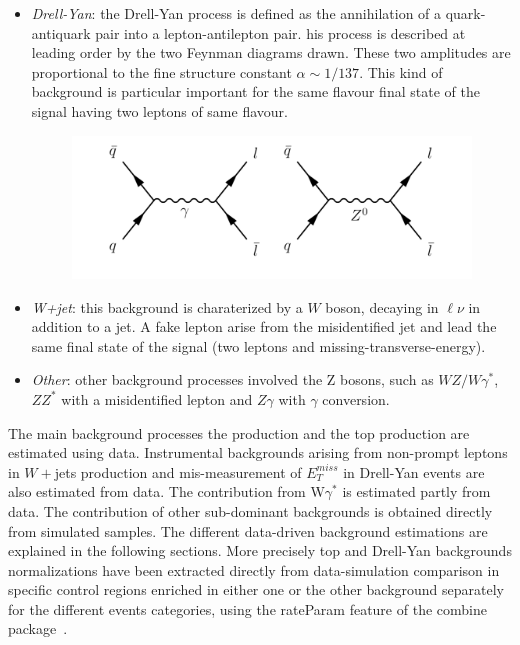 \begin{itemize}
\begin{figure}
\end{figure}
\newpage
\item \textit{Drell-Yan}: the Drell-Yan process is defined as the annihilation of a quark-antiquark pair into a lepton-antilepton pair. his process is described at leading order by
the two Feynman diagrams drawn. These two amplitudes are proportional to the fine structure constant $\alpha \sim 1/137$.
This kind of background is particular important for the same flavour final state of the signal having two leptons  of same flavour.
\begin{figure}[h]
\centering
\vspace{0.5cm}
\includegraphics[scale= 0.7]{../Cap5/dy}
\end{figure}

\item \textit{W+jet}: this background is charaterized by a $W$ boson, decaying in $\ell \nu$ in addition to a jet. A fake lepton arise from the misidentified jet and lead the same final state of the signal (two leptons and missing-transverse-energy). 

\item \textit{Other}: other background processes involved the Z bosons, such as $WZ/W\gamma^*$, $ZZ^*$ with a misidentified lepton and $Z\gamma$ with $\gamma$ conversion.

\end{itemize}
The main background processes the \WW production and the top production  are estimated using data. 
Instrumental backgrounds arising from non-prompt leptons in $W+$jets production and mis-measurement of $E_T^{miss}$ in Drell-Yan events are also estimated from
data. The contribution from W$\gamma^*$  is estimated partly from data. The
contribution of other sub-dominant backgrounds is obtained directly from simulated samples. The different data-driven background estimations are explained in the following sections. More precisely top and  Drell-Yan backgrounds normalizations have been extracted
directly from data-simulation comparison in specific control regions enriched in either one
or the other background separately for the different events categories, using the rateParam feature of the combine package~\cite{combine}.


